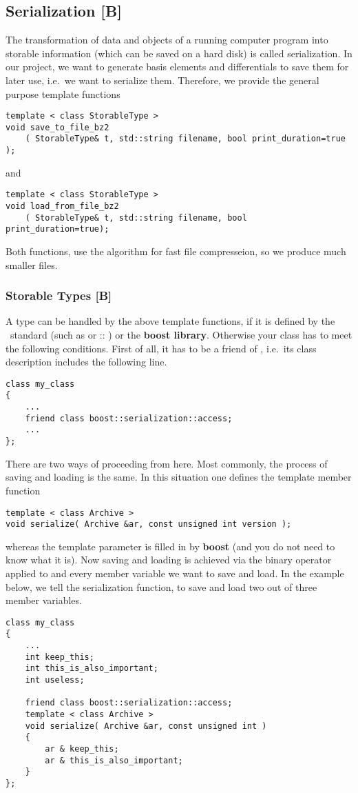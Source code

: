 \subsection{Serialization [B]}
\label{program:kappa:serialization}

The transformation of data and objects of a running computer program into storable information (which can be saved on a hard disk) is called serialization.
In our project, we want to generate basis elements and differentials to save them for later use, i.e.\ we want to serialize them.
Therefore, we provide the general purpose template functions
\begin{lstlisting}
template < class StorableType >
void save_to_file_bz2
    ( StorableType& t, std::string filename, bool print_duration=true );
\end{lstlisting}
and
\begin{lstlisting}
template < class StorableType >
void load_from_file_bz2
    ( StorableType& t, std::string filename, bool print_duration=true);
\end{lstlisting}
Both functions, use the  algorithm for fast file compresseion, so we produce much smaller files.

\subsubsection{Storable Types [B]}
A type can be handled by the above template functions, if
it is defined by the \cppeleven\ standard (such as  or ::\progname{<}  \progname{>}) or the {\bf boost \cpp library}.
Otherwise your class has to meet the following conditions.
First of all, it has to be a friend of \progname{::}\progname{::}, i.e.\ its class description includes the following line.
\begin{lstlisting}
class my_class
{
    ...
    friend class boost::serialization::access;
    ...
};
\end{lstlisting}
There are two ways of proceeding from here.
Most commonly, the process of saving and loading is the same.
In this situation one defines the template member function
\begin{lstlisting}
template < class Archive >
void serialize( Archive &ar, const unsigned int version );
\end{lstlisting}
whereas the template parameter  is filled in by {\bf boost} (and you do not need to know what it is).
Now saving and loading is achieved via the binary operator \progname{\&} applied to  and every member variable we want to save and load.
In the example below, we tell the serialization function, to save and load two out of three member variables.
\begin{lstlisting}
class my_class
{
    ...
    int keep_this;
    int this_is_also_important;
    int useless;
    
    friend class boost::serialization::access;
    template < class Archive >
    void serialize( Archive &ar, const unsigned int )
    {
        ar & keep_this;
        ar & this_is_also_important;
    }
};
\end{lstlisting}

